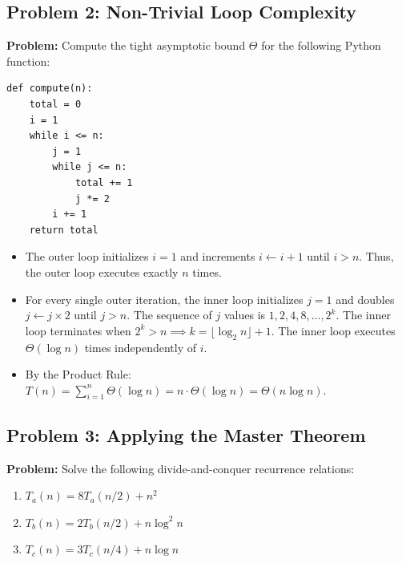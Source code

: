 \documentclass[11pt,a4paper]{article}
\begin{document}
\subsection{Problem 2: Non-Trivial Loop Complexity}
\textbf{Problem:} Compute the tight asymptotic bound $\Theta$ for the following Python function:
\begin{lstlisting}[style=pythonstyle]
def compute(n):
    total = 0
    i = 1
    while i <= n:
        j = 1
        while j <= n:
            total += 1
            j *= 2
        i += 1
    return total
\end{lstlisting}

\begin{definitionbox}
\begin{itemize}[itemsep=2pt]
    \item The outer loop initializes $i = 1$ and increments $i \leftarrow i + 1$ until $i > n$. Thus, the outer loop executes exactly $n$ times.
    \item For every single outer iteration, the inner loop initializes $j = 1$ and doubles $j \leftarrow j \times 2$ until $j > n$. The sequence of $j$ values is $1, 2, 4, 8, \dots, 2^k$. The inner loop terminates when $2^k > n \implies k = \lfloor \log_2 n \rfloor + 1$. The inner loop executes $\Theta(\log n)$ times independently of $i$.
    \item By the Product Rule: $T(n) = \sum_{i=1}^n \Theta(\log n) = n \cdot \Theta(\log n) = \Theta(n \log n)$.
\end{itemize}
\end{definitionbox}

\subsection{Problem 3: Applying the Master Theorem}
\textbf{Problem:} Solve the following divide-and-conquer recurrence relations:
\begin{enumerate}[itemsep=2pt]
    \item $T_a(n) = 8 T_a(n/2) + n^2$
    \item $T_b(n) = 2 T_b(n/2) + n \log^2 n$
    \item $T_c(n) = 3 T_c(n/4) + n \log n$
\end{enumerate}
\end{document}
